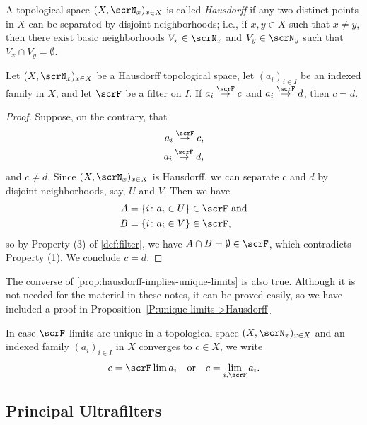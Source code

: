 \begin{definition}
  A topological space $(X,\scrN_x)_{x\in X}$ is called \emph{Hausdorff} if any two distinct points in $X$ can be separated by disjoint neighborhoods;
  i.e., if $x,y\in X$ such that $x\not =y$, then there exist basic neighborhoods $V_x\in\scrN_x$ and $V_y\in\scrN_y$ such that $V_x\cap V_y=\emptyset$.
\end{definition}

\begin{proposition}
  \label{prop:hausdorff-implies-unique-limits}
  Let $(X,\scrN_x)_{x\in X}$ be a Hausdorff topological space, let $(a_i)_{i\in I}$ be an indexed family in $X$, and let $\scrF$ be a filter on $I$.
  If $a_i\overset{\scrF}\to c$ and $a_i\overset{\scrF}\to d$, then $c=d$.
\end{proposition}

\begin{proof}
  Suppose, on the contrary, that
  \begin{align*}
  a_i\overset{\scrF}\to c \text{,} \\
  a_i\overset{\scrF}\to d\text{,}
  \end{align*}
  and $c\not=d$.
  Since $(X,\scrN_x)_{x\in X}$ is Hausdorff, we can separate $c$ and $d$ by disjoint neighborhoods, say, $U$ and $V$.
  Then we have
  \begin{align*}
  A & =\{i \colon a_i\in U\}\in\scrF \text{ and} \\
  B & =\{i \colon a_i\in V\}\in\scrF\text{,}
  \end{align*}
  so by Property (3) of \cref{def:filter}, we have $A\cap B=\emptyset\in \scrF$, which contradicts Property (1).
  We conclude $c=d$.
\end{proof}

The converse of \cref{prop:hausdorff-implies-unique-limits} is also true.
Although it is not needed for the material in these notes, it can be proved easily, so we have included a proof in Proposition~\ref{P:unique limits->Hausdorff}

\begin{notation}
  In case $\scrF$-limits are unique in a topological space $(X,\scrN_x)_{x\in X}$ and an indexed family $(a_i)_{i\in I}$ in $X$ converges to $c\in X$, we write
  \[
    c=\scrF\lim a_i \quad \text{or} \quad c= \lim\limits_{i,\scrF}a_i \text{.}
  \]
\end{notation}

\subsection{Principal Ultrafilters \nopunct}

